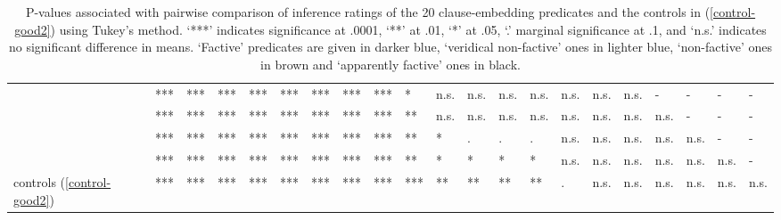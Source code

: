 \documentclass[11pt,fleqn]{article}
\newcommand{\6}{\mbox{$[\hspace*{-.6mm}[$}}
\newcommand{\9}{\mbox{$]\hspace*{-.6mm}]$}}
\begin{document}
\begin{table}[h!]
\begin{tabular}{l l l l l l l l l l l l l l l l l l l l l }
\color{blue}{\em discover}\color{black}			& *** & *** & *** & *** & *** & *** & *** & *** & * & n.s. & n.s. & n.s. & n.s. & n.s. & n.s. & n.s. & - & - & - & -\\
\color{blue}{\em see}\color{black}			& *** & *** & *** & *** & *** & *** & *** & *** & ** & n.s. & n.s. & n.s. & n.s. & n.s. & n.s. & n.s. & n.s. & - & - & - \\
\color{airforceblue}{\em be right}\color{black}			& *** & *** & *** & *** & *** & *** & *** & *** & ** & * & . & . & . & n.s. & n.s. & n.s. & n.s. & n.s. & - & - \\
\color{black}{\em prove}\color{black}		& *** & *** & *** & *** & *** & *** & *** & *** & **  & *  & * & * & * & n.s. & n.s. & n.s. & n.s. & n.s. & n.s. & - \\
\color{black}controls (\ref{control-good2})\color{black}		& *** & *** & *** & *** & *** & *** & *** & *** & ***  & ** & ** & ** & ** & . & n.s. & n.s. & n.s. & n.s. & n.s.  & n.s. \\

\bottomrule
\end{tabular}
\caption{P-values associated with pairwise comparison of inference ratings of the 20 clause-embedding predicates and the controls in (\ref{control-good2}) using Tukey's method. `***' indicates significance at .0001, `**' at .01, `*' at .05, `.' marginal significance at .1, and `n.s.' indicates no significant difference in means. `Factive' predicates are given in darker blue, `veridical non-factive' ones in lighter blue, `non-factive' ones in brown and `apparently factive' ones in black.}\label{t-pairwise2}
\end{table}
\end{document}
